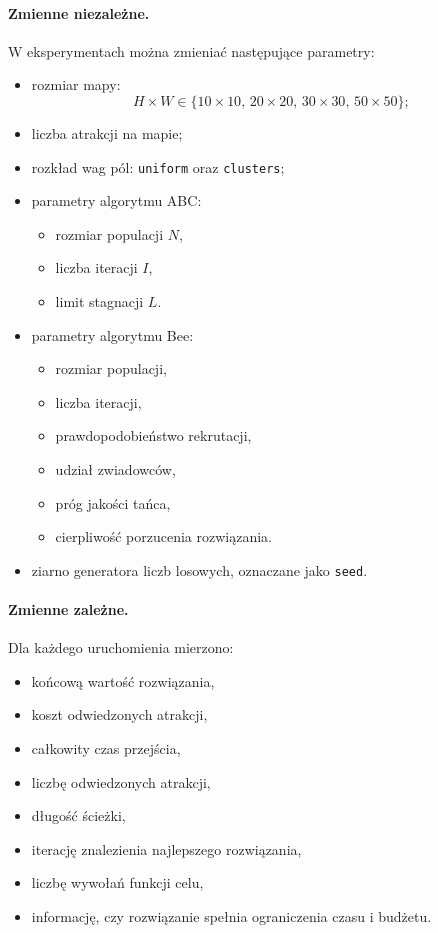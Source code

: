 \paragraph{Zmienne niezależne.}
W eksperymentach można zmieniać następujące parametry:
\begin{itemize}
    \item rozmiar mapy:
    \[
        H \times W
        \in
        \{
        10 \times 10,\,
        20 \times 20,\,
        30 \times 30,\,
        50 \times 50
        \};
    \]
    \item liczba atrakcji na mapie;
    \item rozkład wag pól: \texttt{uniform} oraz \texttt{clusters};
    \item parametry algorytmu ABC:
    \begin{itemize}
        \item rozmiar populacji $N$,
        \item liczba iteracji $I$,
        \item limit stagnacji $L$.
    \end{itemize}
    \item parametry algorytmu Bee:
    \begin{itemize}
        \item rozmiar populacji,
        \item liczba iteracji,
        \item prawdopodobieństwo rekrutacji,
        \item udział zwiadowców,
        \item próg jakości tańca,
        \item cierpliwość porzucenia rozwiązania.
    \end{itemize}
    \item ziarno generatora liczb losowych, oznaczane jako \texttt{seed}.
\end{itemize}

\paragraph{Zmienne zależne.}
Dla każdego uruchomienia mierzono:
\begin{itemize}
    \item końcową wartość rozwiązania,
    \item koszt odwiedzonych atrakcji,
    \item całkowity czas przejścia,
    \item liczbę odwiedzonych atrakcji,
    \item długość ścieżki,
    \item iterację znalezienia najlepszego rozwiązania,
    \item liczbę wywołań funkcji celu,
    \item informację, czy rozwiązanie spełnia ograniczenia czasu i budżetu.
\end{itemize}

